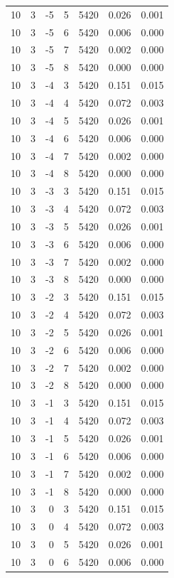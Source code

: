\begin{table}
\begin{tabular}{rrrrrrr}
10 & 3 & -5 & 5 & 5420 & 0.026 & 0.001 \\
10 & 3 & -5 & 6 & 5420 & 0.006 & 0.000 \\
10 & 3 & -5 & 7 & 5420 & 0.002 & 0.000 \\
10 & 3 & -5 & 8 & 5420 & 0.000 & 0.000 \\
10 & 3 & -4 & 3 & 5420 & 0.151 & 0.015 \\
10 & 3 & -4 & 4 & 5420 & 0.072 & 0.003 \\
10 & 3 & -4 & 5 & 5420 & 0.026 & 0.001 \\
10 & 3 & -4 & 6 & 5420 & 0.006 & 0.000 \\
10 & 3 & -4 & 7 & 5420 & 0.002 & 0.000 \\
10 & 3 & -4 & 8 & 5420 & 0.000 & 0.000 \\
10 & 3 & -3 & 3 & 5420 & 0.151 & 0.015 \\
10 & 3 & -3 & 4 & 5420 & 0.072 & 0.003 \\
10 & 3 & -3 & 5 & 5420 & 0.026 & 0.001 \\
10 & 3 & -3 & 6 & 5420 & 0.006 & 0.000 \\
10 & 3 & -3 & 7 & 5420 & 0.002 & 0.000 \\
10 & 3 & -3 & 8 & 5420 & 0.000 & 0.000 \\
10 & 3 & -2 & 3 & 5420 & 0.151 & 0.015 \\
10 & 3 & -2 & 4 & 5420 & 0.072 & 0.003 \\
10 & 3 & -2 & 5 & 5420 & 0.026 & 0.001 \\
10 & 3 & -2 & 6 & 5420 & 0.006 & 0.000 \\
10 & 3 & -2 & 7 & 5420 & 0.002 & 0.000 \\
10 & 3 & -2 & 8 & 5420 & 0.000 & 0.000 \\
10 & 3 & -1 & 3 & 5420 & 0.151 & 0.015 \\
10 & 3 & -1 & 4 & 5420 & 0.072 & 0.003 \\
10 & 3 & -1 & 5 & 5420 & 0.026 & 0.001 \\
10 & 3 & -1 & 6 & 5420 & 0.006 & 0.000 \\
10 & 3 & -1 & 7 & 5420 & 0.002 & 0.000 \\
10 & 3 & -1 & 8 & 5420 & 0.000 & 0.000 \\
10 & 3 & 0 & 3 & 5420 & 0.151 & 0.015 \\
10 & 3 & 0 & 4 & 5420 & 0.072 & 0.003 \\
10 & 3 & 0 & 5 & 5420 & 0.026 & 0.001 \\
10 & 3 & 0 & 6 & 5420 & 0.006 & 0.000 \\

\end{tabular}
\end{table}
